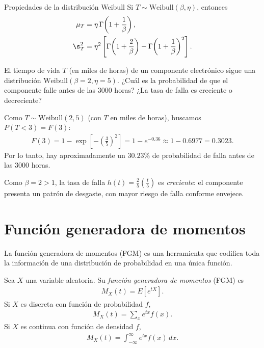 {Propiedades de la distribución Weibull} Si $T \sim \text{Weibull}(\beta,\eta)$,
entonces
\begin{align}
 \mu_T &= \eta\,\Gamma\!\left(1 + \frac{1}{\beta}\right), \\
 \s_T^2 &= \eta^2\left[\Gamma\!\left(1 + \frac{2}{\beta}\right)
 - \Gamma\!\left(1 + \frac{1}{\beta}\right)^2\right].
\end{align}

\begin{ejemplo}
 \label{exmp:2.8.8}
El tiempo de vida $T$ (en miles de horas) de un componente electrónico sigue una
distribución $\text{Weibull}(\beta=2, \eta=5)$. ¿Cuál es la probabilidad de que el
componente falle antes de las $3000$ horas? ¿La tasa de falla es creciente o
decreciente?
\end{ejemplo}

\begin{solucion}
Como $T \sim \text{Weibull}(2,5)$ (con $T$ en miles de horas), buscamos $P(T < 3) =
F(3)$:
\begin{align}
 F(3) = 1 - \exp\!\left[-\left(\frac{3}{5}\right)^2\right]
 = 1 - e^{-0.36} \approx 1 - 0.6977 = 0.3023.
\end{align}
Por lo tanto, hay aproximadamente un $30.23\%$ de probabilidad de falla antes de las
$3000$ horas.

Como $\beta = 2 > 1$, la tasa de falla $h(t) = \frac{2}{5}\left(\frac{t}{5}\right)$ es
\emph{creciente}: el componente presenta un patrón de desgaste, con mayor riesgo de
falla conforme envejece.
\end{solucion}



\section{Función generadora de momentos}
\label{sec:mgf}\label{sec:3.4}

La función generadora de momentos (FGM) es una herramienta que codifica toda la
información de una distribución de probabilidad en una única función.

\begin{definicion}
Sea $X$ una variable aleatoria. Su \emph{función generadora de momentos} (FGM) es
\begin{align}
 \label{eq:2.8.11}
 M_X(t) = E\!\left[e^{tX}\right].
\end{align}
Si $X$ es discreta con función de probabilidad $f$,
\begin{align}
 M_X(t) = \sum_x e^{tx} f(x).
\end{align}
Si $X$ es continua con función de densidad $f$,
\begin{align}
 M_X(t) = \int_{-\infty}^{\infty} e^{tx} f(x)\,dx.
\end{align}
\end{definicion}

